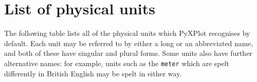 %
%
%
%
%



\chapter{List of physical units}
\label{ch:unit_list}

The following table lists all of the physical units which PyXPlot recognises by
default. Each unit may be referred to by either a long or an abbreviated name,
and both of these have singular and plural forms. Some units also have further
alternative names: for example, units such as the {\tt meter} which are spelt
differently in British English may be spelt in either way.

